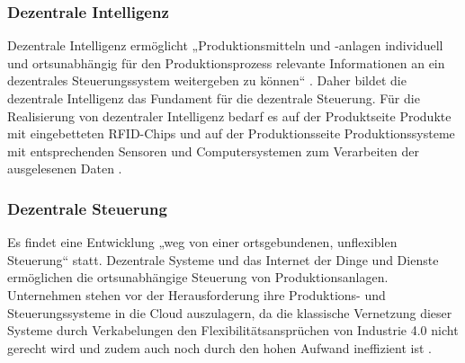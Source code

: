 \subsubsection{Dezentrale Intelligenz}\label{sec:DezentraleIntelligenz}
Dezentrale Intelligenz ermöglicht „Produktionsmitteln und -anlagen individuell und ortsunabhängig für den Produktionsprozess relevante Informationen an ein dezentrales Steuerungssystem weitergeben zu können“ \cite[S.39]{14}. Daher bildet die dezentrale Intelligenz das Fundament für die dezentrale Steuerung. 
Für die Realisierung von dezentraler Intelligenz bedarf es auf der Produktseite Produkte mit eingebetteten RFID-Chips und auf der Produktionsseite Produktionssysteme mit entsprechenden Sensoren und Computersystemen zum Verarbeiten der ausgelesenen Daten \cite[S.39]{14}.

\subsubsection{Dezentrale Steuerung}\label{sec:DezentraleSteuerung}
Es findet eine Entwicklung „weg von einer ortsgebundenen, unflexiblen Steuerung“ \cite[S.40]{14} statt. Dezentrale Systeme und das Internet der Dinge und Dienste ermöglichen die ortsunabhängige Steuerung von Produktionsanlagen.
Unternehmen stehen vor der Herausforderung ihre Produktions- und Steuerungssysteme in die Cloud auszulagern, da die klassische Vernetzung dieser Systeme durch Verkabelungen den Flexibilitätsansprüchen von Industrie 4.0 nicht gerecht wird und zudem auch noch durch den hohen Aufwand ineffizient ist \cite[S.40]{14}.

